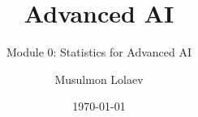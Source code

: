 \documentclass[aspectratio=169]{beamer}
\title{Advanced AI}
\subtitle{Module 0: Statistics for Advanced AI}
\author{Musulmon Lolaev}
\institute{TQQT LLC}
\date{\today}
\begin{document}
\begin{frame}
\titlepage
\end{frame}

% 

% 
% 

% 
% 

% 
% 

% 
% 




% 
% 

% 
% 

%  
% 
 
%  
% 

% 
\end{document}

